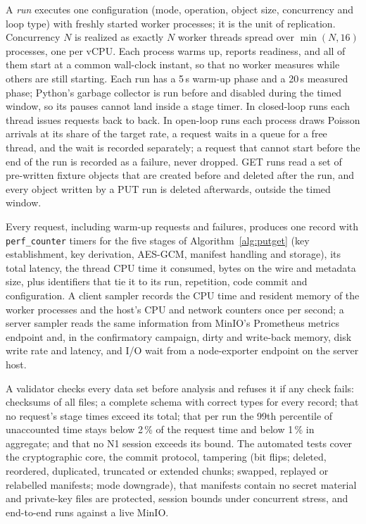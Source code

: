 \documentclass[conference]{IEEEtran}
\begin{document}
A \emph{run} executes one configuration (mode, operation, object size, concurrency and loop type)
with freshly started worker processes; it is the unit of replication. Concurrency $N$ is realized
as exactly $N$ worker threads spread over $\min(N,16)$ processes, one per vCPU. Each process warms
up, reports readiness, and all of them start at a common wall-clock instant, so that no worker
measures while others are still starting. Each run has a 5\,s warm-up phase and a 20\,s measured
phase; Python's garbage collector is run before and disabled during the timed window, so its
pauses cannot land inside a stage timer. In closed-loop runs each thread issues requests back to
back. In open-loop runs each process draws Poisson arrivals at its share of the target rate, a
request waits in a queue for a free thread, and the wait is recorded separately; a request that
cannot start before the end of the run is recorded as a failure, never dropped. GET runs read a
set of pre-written fixture objects that are created before and deleted after the run, and every
object written by a PUT run is deleted afterwards, outside the timed window.

Every request, including warm-up requests and failures, produces one record with
\texttt{perf\_counter} timers for the five stages of Algorithm~\ref{alg:putget} (key
establishment, key derivation, AES-GCM, manifest handling and storage), its total latency, the
thread CPU time it consumed, bytes on the wire and metadata size, plus identifiers that tie it to
its run, repetition, code commit and configuration. A client sampler records the CPU time and
resident memory of the worker processes and the host's CPU and network counters once per second;
a server sampler reads the same information from MinIO's Prometheus metrics endpoint and, in
the confirmatory campaign, dirty and write-back memory, disk write rate and latency, and I/O wait
from a node-exporter endpoint on the server host.

A validator checks every data set before analysis and refuses it if any check fails: checksums of
all files; a complete schema with correct types for every record; that no request's stage times
exceed its total; that per run the 99th percentile of unaccounted time stays below 2\,\% of the
request time and below 1\,\% in aggregate; and that no N1 session exceeds its bound. The
\TestCount{} automated tests cover the cryptographic core, the commit protocol, tampering (bit flips; deleted, reordered, duplicated, truncated or extended chunks; swapped, replayed or relabelled manifests; mode downgrade), that manifests contain no secret material and private-key files are protected, session bounds under concurrent stress, and
end-to-end runs against a live MinIO.
\end{document}
